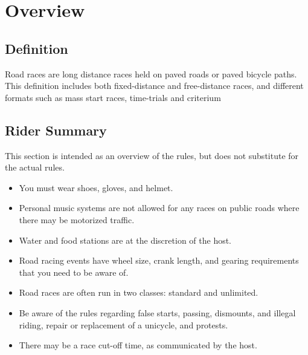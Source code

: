 \chapter{Overview \label{chap:road_racing}}

\section{Definition}

Road races are long distance races held on paved roads or paved bicycle paths.
This definition includes both fixed-distance and free-distance races, and different formats such as mass start races, time-trials and criterium

\section{Rider Summary}

This section is intended as an overview of the rules, but does not substitute for the actual rules.
\begin{itemize}
  \item You must wear shoes, gloves, and helmet.
  \item Personal music systems are not allowed for any races on public roads where there may be motorized traffic.
  \item Water and food stations are at the discretion of the host.
  \item Road racing events have wheel size, crank length, and gearing
  requirements that you need to be aware of.
  \item Road races are often run in two classes: standard and unlimited.
  \item Be aware of the rules regarding false starts, passing, dismounts, and illegal riding, repair or 
  replacement of a unicycle, and protests.
  \item There may be a race cut-off time, as communicated by the host.
\end{itemize}
